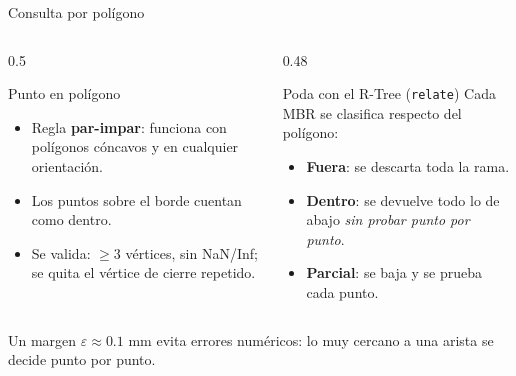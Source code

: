 \documentclass[aspectratio=169,10pt]{beamer}
\begin{document}
\begin{frame}{Consulta por polígono}
  \begin{columns}[T]
    \begin{column}{0.5\textwidth}
      \begin{block}{Punto en polígono}
        \small
        \begin{itemize}
          \item Regla \textbf{par-impar}: funciona con polígonos cóncavos y en cualquier orientación.
          \item Los puntos sobre el borde cuentan como dentro.
          \item Se valida: $\ge 3$ vértices, sin NaN/Inf; se quita el vértice de cierre repetido.
        \end{itemize}
      \end{block}
    \end{column}
    \begin{column}{0.48\textwidth}
      \begin{block}{Poda con el R-Tree (\texttt{relate})}
        \small Cada MBR se clasifica respecto del polígono:
        \begin{itemize}
          \item \textcolor{rojo}{\textbf{Fuera}}: se descarta toda la rama.
          \item \textcolor{verde}{\textbf{Dentro}}: se devuelve todo lo de abajo \emph{sin probar punto por punto}.
          \item \textcolor{acento}{\textbf{Parcial}}: se baja y se prueba cada punto.
        \end{itemize}
      \end{block}
    \end{column}
  \end{columns}
  \vspace{0.5em}
  \small Un margen $\varepsilon \approx 0.1$ mm evita errores numéricos: lo muy cercano a una arista se decide punto por punto.
\end{frame}
\end{document}
